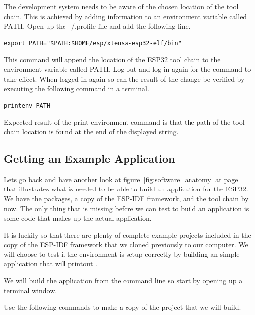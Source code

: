 \documentclass{tufte-book}
\begin{document}

The development system needs to be aware of the chosen location of the tool chain. This is achieved by adding information to an environment variable called PATH. Open up the ~/.profile file and add the following line.

\begin{lstlisting}
export PATH="$PATH:$HOME/esp/xtensa-esp32-elf/bin"
\end{lstlisting}

This command will append the location of the ESP32 tool chain to the environment variable called PATH. Log out and log in again for the command to take effect. When logged in again so can the result of the change be verified by executing the following command in a terminal.

\begin{lstlisting}
printenv PATH
\end{lstlisting}

Expected result of the print environment command is that the path of the tool chain location is found at the end of the displayed string.

\subsection{Getting an Example Application}
Lets go back and have another look at figure~\ref{fig:software_anatomy} at page~\pageref{fig:software_anatomy} that illustrates what is needed to be able to build an application for the ESP32. We have the packages, a copy of the ESP-IDF framework, and the tool chain by now. The only thing that is missing before we can test to build an application is some code that makes up the actual application.

It is luckily so that there are plenty of complete example projects included in the copy of the ESP-IDF framework that we cloned previously to our computer. We will choose to test if the environment is setup correctly by building an simple application that will printout .

We will build the application from the command line so start by opening up a terminal window.


Use the following commands to make a copy of the project that we will build.
\end{document}
